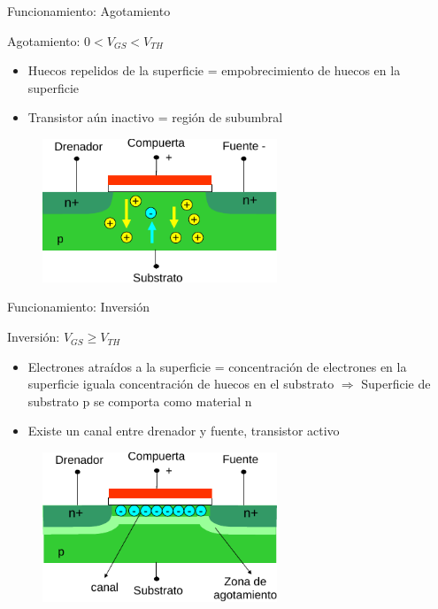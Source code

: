 \documentclass[t,aspectratio=169,10pt]{beamer}
\begin{document}
\begin{frame}{Funcionamiento: Agotamiento}

Agotamiento: \hspace{5mm} $0 < V_{GS} < V_{TH}$

\begin{itemize}
    \item Huecos repelidos de la superficie = empobrecimiento de huecos en la superficie
    \item Transistor aún inactivo = región de subumbral
\end{itemize}

\begin{figure}[H]
    \centering
    \includegraphics[width=7cm]{agota1}
\end{figure}

\end{frame}


\begin{frame}{Funcionamiento: Inversión}

Inversión:\hspace{1cm} $V_{GS} \geq V_{TH}$

\begin{itemize}
	\item Electrones atraídos a la superficie = concentración de electrones en la superficie iguala concentración de huecos en el substrato $\Rightarrow$ Superficie de substrato p se comporta como material n
	\item Existe un canal entre drenador y fuente, transistor activo
\end{itemize}

\begin{figure}[H]
    \centering
    \includegraphics[width=7cm]{inversion1}
\end{figure}

\end{frame}
\end{document}
